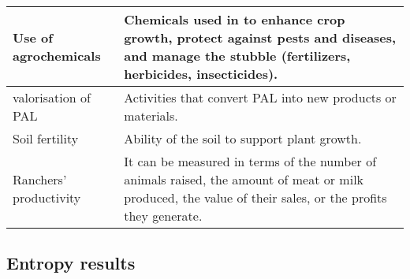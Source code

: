 \begin{table}[htp]
\begin{tabular}{p{}p{}}
Use of agrochemicals &
  Chemicals used in to enhance crop growth, protect against pests and diseases, and manage the stubble (fertilizers, herbicides, insecticides). \\ \hline
valorisation of PAL &
  Activities that convert PAL into new products or materials. \\ \hline
Soil fertility &
  Ability of the soil to support plant growth. \\ \hline
Ranchers' productivity &
  It can be measured in terms of the number of animals raised, the amount of meat or milk produced, the value of their sales, or the profits they generate.

\end{tabular}

\end{table}
\clearpage

\subsection{Entropy results}
\label{entropyResults}

